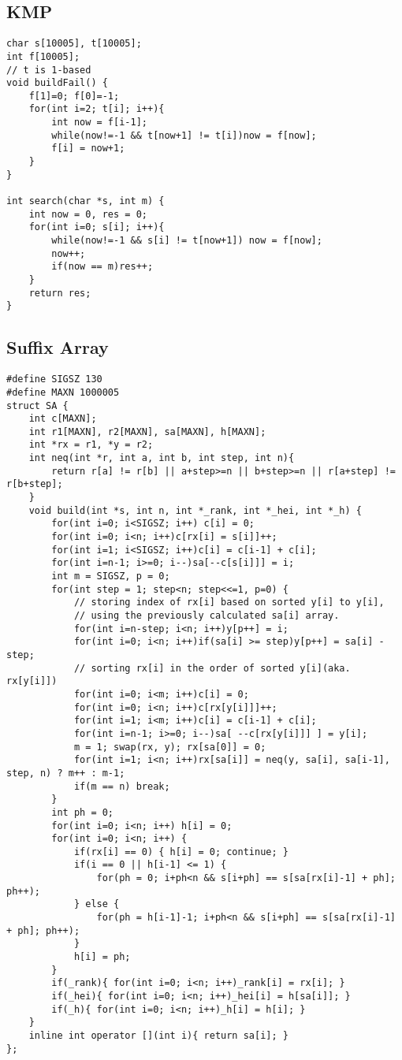 \subsection{KMP}
\begin{lstlisting}
char s[10005], t[10005];
int f[10005];
// t is 1-based
void buildFail() {
	f[1]=0; f[0]=-1;
	for(int i=2; t[i]; i++){
		int now = f[i-1];
		while(now!=-1 && t[now+1] != t[i])now = f[now];
		f[i] = now+1;
	}
}

int search(char *s, int m) {
	int now = 0, res = 0;
	for(int i=0; s[i]; i++){
		while(now!=-1 && s[i] != t[now+1]) now = f[now];
		now++; 
		if(now == m)res++;
	}
	return res;
}
\end{lstlisting}
\subsection{Suffix Array}
\begin{lstlisting}
#define SIGSZ 130
#define MAXN 1000005
struct SA {
	int c[MAXN];
	int r1[MAXN], r2[MAXN], sa[MAXN], h[MAXN];
	int *rx = r1, *y = r2;
	int neq(int *r, int a, int b, int step, int n){
		return r[a] != r[b] || a+step>=n || b+step>=n || r[a+step] != r[b+step]; 
	}
	void build(int *s, int n, int *_rank, int *_hei, int *_h) {
		for(int i=0; i<SIGSZ; i++) c[i] = 0;
		for(int i=0; i<n; i++)c[rx[i] = s[i]]++;
		for(int i=1; i<SIGSZ; i++)c[i] = c[i-1] + c[i];
		for(int i=n-1; i>=0; i--)sa[--c[s[i]]] = i;
		int m = SIGSZ, p = 0;
		for(int step = 1; step<n; step<<=1, p=0) {
			// storing index of rx[i] based on sorted y[i] to y[i],
			// using the previously calculated sa[i] array.
			for(int i=n-step; i<n; i++)y[p++] = i;
			for(int i=0; i<n; i++)if(sa[i] >= step)y[p++] = sa[i] - step;
			// sorting rx[i] in the order of sorted y[i](aka. rx[y[i]])
			for(int i=0; i<m; i++)c[i] = 0;
			for(int i=0; i<n; i++)c[rx[y[i]]]++;
			for(int i=1; i<m; i++)c[i] = c[i-1] + c[i];
			for(int i=n-1; i>=0; i--)sa[ --c[rx[y[i]]] ] = y[i];
			m = 1; swap(rx, y); rx[sa[0]] = 0;
			for(int i=1; i<n; i++)rx[sa[i]] = neq(y, sa[i], sa[i-1], step, n) ? m++ : m-1;
			if(m == n) break;
		}
		int ph = 0;
		for(int i=0; i<n; i++) h[i] = 0;
		for(int i=0; i<n; i++) {
			if(rx[i] == 0) { h[i] = 0; continue; }
			if(i == 0 || h[i-1] <= 1) {
				for(ph = 0; i+ph<n && s[i+ph] == s[sa[rx[i]-1] + ph]; ph++);
			} else {
				for(ph = h[i-1]-1; i+ph<n && s[i+ph] == s[sa[rx[i]-1] + ph]; ph++);
			}
			h[i] = ph;
		}
		if(_rank){ for(int i=0; i<n; i++)_rank[i] = rx[i]; }
		if(_hei){ for(int i=0; i<n; i++)_hei[i] = h[sa[i]]; }
		if(_h){ for(int i=0; i<n; i++)_h[i] = h[i]; }
	}
	inline int operator [](int i){ return sa[i]; }
};
\end{lstlisting}
